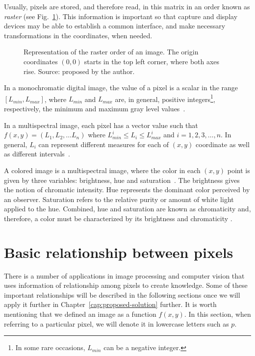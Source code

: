 Usually, pixels are stored, and therefore read, in this matrix in an order known as \textit{raster} (see Fig.~\ref{fig:raster}). This information is important so that capture and display devices may be able to establish a common interface, and make necessary transformations in the coordinates, when needed.

\begin{figure}[ht]
    \centering

    \caption[Representation of the raster order of an image]{Representation of the raster order of an image. The origin coordinates $(0, 0)$ starts in the top left corner, where both axes rise. Source: proposed by the author.}
    \label{fig:raster}
\end{figure}


In a monochromatic digital image, the value of a pixel is a scalar in the range $[L_{min}, L_{max}]$, where $L_{min}$ and $L_{max}$ are, in general, positive integers\footnote{In some rare occasions, $L_{min}$ can be a negative integer.}, respectively, the minimum and maximum gray level values~\citep{pedrini:08}.

In a multispectral image, each pixel has a vector value such that $f(x, y) = (L_1, L_2, \ldots L_n)$ where $L^i_{min} \leq L_i \leq L^i_{max}$ and $i = 1, 2, 3, \ldots, n$. In general, $L_i$ can represent different measures for each of $(x, y)$ coordinate as well as different intervals~\citep{pedrini:08}.

A colored image is a multispectral image, where the color in each $(x, y)$ point is given by three variables: brightness, hue and saturation~\citep{pedrini:08}. The brightness gives the notion of chromatic intensity. Hue represents the dominant color perceived by an observer. Saturation refers to the relative purity or amount of white light applied to the hue. Combined, hue and saturation are known as chromaticity and, therefore, a color must be characterized by its brightness and chromaticity \citep{gonzalez:02}.


\section{Basic relationship between pixels}
\label{sec:image_components_relation}
There is a number of applications in image processing and computer vision that uses information of relationship among pixels to create knowledge. Some of these important relationships will be described in the following sections once we will apply it further in Chapter~\ref{cap:proposed-solution} further. It is worth mentioning that we defined an image as a function $f(x, y)$. In this section, when referring to a particular pixel, we will denote it in lowercase letters such as $p$.



